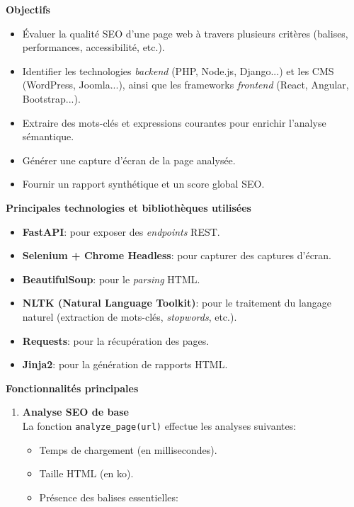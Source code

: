 \begin{justify}
{\fontsize{14}{17}\selectfont \textbf{Objectifs}}
\begin{itemize}[label=$\bullet$]
    \item Évaluer la qualité SEO d’une page web à travers plusieurs critères (balises, performances, accessibilité, etc.).
    \item Identifier les technologies \textit{backend} (PHP, Node.js, Django...) et les CMS (WordPress, Joomla...), ainsi que les frameworks \textit{frontend} (React, Angular, Bootstrap...).
    \item Extraire des mots-clés et expressions courantes pour enrichir l’analyse sémantique.
    \item Générer une capture d’écran de la page analysée.
    \item Fournir un rapport synthétique et un score global SEO.
\end{itemize}
\vspace{0.3cm}
{\fontsize{14}{17}\selectfont \textbf{Principales technologies et bibliothèques utilisées}}
\begin{itemize}[label=$\bullet$]
    \item \textbf{FastAPI}: pour exposer des \textit{endpoints} REST.
    \item \textbf{Selenium + Chrome Headless}: pour capturer des captures d’écran.
    \item \textbf{BeautifulSoup}: pour le \textit{parsing} HTML.
    \item \textbf{NLTK (Natural Language Toolkit)}: pour le traitement du langage naturel (extraction de mots-clés, \textit{stopwords}, etc.).
    \item \textbf{Requests}: pour la récupération des pages.
    \item \textbf{Jinja2}: pour la génération de rapports HTML.
\end{itemize}
\vspace{0.3cm}
{\fontsize{14}{17}\selectfont \textbf{Fonctionnalités principales}}
\begin{enumerate}[label=\alph*)]
    \item  \textbf{Analyse SEO de base}\\
        La fonction \texttt{analyze\_page(url)} effectue les analyses suivantes:
        \begin{itemize}[label=$\bullet$]
            \item Temps de chargement (en millisecondes).
            \item Taille HTML (en ko).
            \item Présence des balises essentielles:

\end{itemize}
\end{enumerate}
\end{justify}
